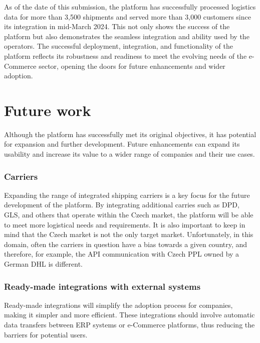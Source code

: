 As of the date of this submission, the platform has successfully processed logistics data for more than 3,500 shipments and served more than 3,000 customers since its integration in mid-March 2024.
This not only shows the success of the platform but also demonstrates the seamless integration and ability used by the operators.
The successful deployment, integration, and functionality of the platform reflects its robustness and readiness to meet the evolving needs of the e-Commerce sector, opening the doors for future enhancements and wider adoption.


\section*{Future work}
Although the platform has successfully  met its original objectives, it has potential for expansion and further development.
Future enhancements can expand its usability and increase its value to a wider range of companies and their use cases.

\subsubsection*{Carriers}
Expanding the range of integrated shipping carriers is a key focus for the future development of the platform.
By integrating additional carries such as DPD, GLS, and others that operate within the Czech market, the platform will be able to meet more logistical needs and requirements.
It is also important to keep in mind that the Czech market is not the only target market.
Unfortunately, in this domain, often the carriers in question have a bias towards a given country, and therefore, for example, the API communication with Czech PPL owned by a German DHL is different.

\subsubsection*{Ready-made integrations with external systems}
Ready-made integrations will simplify the adoption process for companies, making it simpler and more efficient. 
These integrations should involve automatic data transfers between ERP systems or e-Commerce platforms, thus reducing the barriers for potential users.

